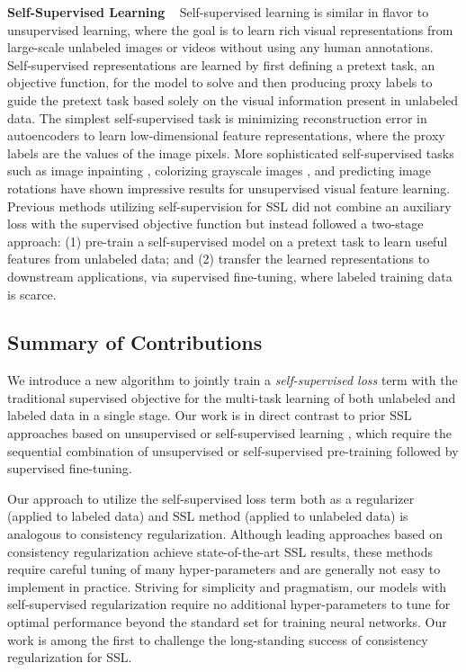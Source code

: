 \documentclass{article}
\begin{document}
\textbf{Self-Supervised Learning} ~ Self-supervised learning is similar in flavor to unsupervised learning, where the goal is to learn rich visual representations from large-scale unlabeled images or videos without using any human annotations. Self-supervised representations are learned by first defining a pretext task, an objective function, for the model to solve and then producing proxy labels to guide the pretext task based solely on the visual information present in unlabeled data. The simplest self-supervised task is minimizing reconstruction error in autoencoders \cite{autoencoder} to learn low-dimensional feature representations, where the proxy labels are the values of the image pixels. More sophisticated self-supervised tasks such as image inpainting \cite{inpainting}, colorizing grayscale images \cite{colorization}, and predicting image rotations \cite{rotations} have shown impressive results for unsupervised visual feature learning. Previous methods utilizing self-supervision for SSL did not combine an auxiliary loss with the supervised objective function but instead followed a two-stage approach: (1) pre-train a self-supervised model on a pretext task to learn useful features from unlabeled data; and (2) transfer the learned representations to downstream applications, via supervised fine-tuning, where labeled training data is scarce.

\subsection{Summary of Contributions}
We introduce a new algorithm to jointly train a \emph{self-supervised loss} term with the traditional supervised objective for the multi-task learning of both unlabeled and labeled data in a single stage. Our work is in direct contrast to prior SSL approaches based on unsupervised or self-supervised learning \cite{ali,rotations}, which require the sequential combination of unsupervised or self-supervised pre-training followed by supervised fine-tuning.

Our approach to utilize the self-supervised loss term both as a regularizer (applied to labeled data) and SSL method (applied to unlabeled data) is analogous to consistency regularization. Although leading approaches based on consistency regularization achieve state-of-the-art SSL results, these methods require careful tuning of many hyper-parameters and are generally not easy to implement in practice. Striving for simplicity and pragmatism, our models with self-supervised regularization require no additional hyper-parameters to tune for optimal performance beyond the standard set for training neural networks. Our work is among the first to challenge the long-standing success of consistency regularization for SSL.
\end{document}
